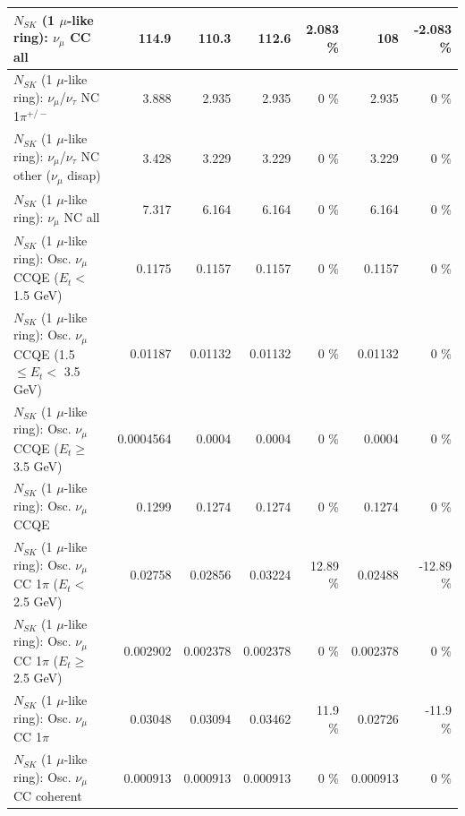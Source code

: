 \begin{table}
\begin{tabular}{| l | r | r | r  r | r  r |}
                                $N_{SK}$ (1 $\mu$-like ring): $\nu_{\mu}$ CC all &           114.9 &           110.3 &           112.6 &    2.083 \%  &             108 &   -2.083 \%  \\ 
\hline
              $N_{SK}$ (1 $\mu$-like ring): $\nu_\mu$/$\nu_\tau$ NC 1$\pi^{+/-}$ &           3.888 &           2.935 &           2.935 &        0 \%  &           2.935 &        0 \%  \\ 
   $N_{SK}$ (1 $\mu$-like ring): $\nu_\mu$/$\nu_\tau$ NC other ($\nu_\mu$ disap) &           3.428 &           3.229 &           3.229 &        0 \%  &           3.229 &        0 \%  \\ 
                                $N_{SK}$ (1 $\mu$-like ring): $\nu_{\mu}$ NC all &           7.317 &           6.164 &           6.164 &        0 \%  &           6.164 &        0 \%  \\ 
\hline
\hline
           $N_{SK}$ (1 $\mu$-like ring): Osc. $\nu_\mu$ CCQE ($E_{t} <$ 1.5 GeV) &          0.1175 &          0.1157 &          0.1157 &        0 \%  &          0.1157 &        0 \%  \\ 
  $N_{SK}$ (1 $\mu$-like ring): Osc. $\nu_\mu$ CCQE (1.5 $\leq E_{t} <$ 3.5 GeV) &         0.01187 &         0.01132 &         0.01132 &        0 \%  &         0.01132 &        0 \%  \\ 
        $N_{SK}$ (1 $\mu$-like ring): Osc. $\nu_\mu$ CCQE ($E_{t} \geq$ 3.5 GeV) &       0.0004564 &          0.0004 &          0.0004 &        0 \%  &          0.0004 &        0 \%  \\ 
\hline
                               $N_{SK}$ (1 $\mu$-like ring): Osc. $\nu_\mu$ CCQE &          0.1299 &          0.1274 &          0.1274 &        0 \%  &          0.1274 &        0 \%  \\ 
\hline
      $N_{SK}$ (1 $\mu$-like ring): Osc. $\nu_\mu$ CC 1$\pi$ ($E_{t} <$ 2.5 GeV) &         0.02758 &         0.02856 &         0.03224 &    12.89 \%  &         0.02488 &   -12.89 \%  \\ 
   $N_{SK}$ (1 $\mu$-like ring): Osc. $\nu_\mu$ CC 1$\pi$ ($E_{t} \geq$ 2.5 GeV) &        0.002902 &        0.002378 &        0.002378 &        0 \%  &        0.002378 &        0 \%  \\ 
\hline
                          $N_{SK}$ (1 $\mu$-like ring): Osc. $\nu_\mu$ CC 1$\pi$ &         0.03048 &         0.03094 &         0.03462 &     11.9 \%  &         0.02726 &    -11.9 \%  \\ 
                        $N_{SK}$ (1 $\mu$-like ring): Osc. $\nu_\mu$ CC coherent &        0.000913 &        0.000913 &        0.000913 &        0 \%  &        0.000913 &        0 \%  \\ 

\end{tabular}
\end{table}
